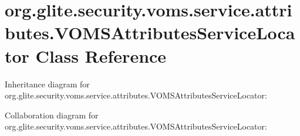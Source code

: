 \hypertarget{classorg_1_1glite_1_1security_1_1voms_1_1service_1_1attributes_1_1VOMSAttributesServiceLocator}{
\section{org.glite.security.voms.service.attributes.VOMSAttributesServiceLocator Class Reference}
\label{classorg_1_1glite_1_1security_1_1voms_1_1service_1_1attributes_1_1VOMSAttributesServiceLocator}
}


Inheritance diagram for org.glite.security.voms.service.attributes.VOMSAttributesServiceLocator:


Collaboration diagram for org.glite.security.voms.service.attributes.VOMSAttributesServiceLocator:
